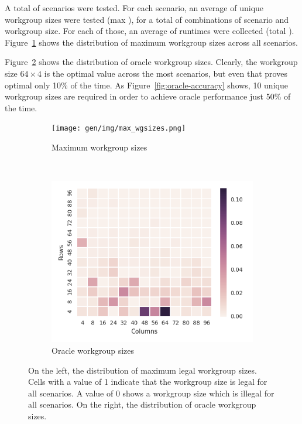 A total of  scenarios were tested. For each
scenario, an average of  unique workgroup
sizes were tested (max ), for a total of
 combinations of scenario and workgroup
size. For each of those, an average of 
runtimes were collected (total
). Figure~\ref{fig:max-wgsizes} shows the
distribution of maximum workgroup sizes across all
scenarios.

Figure~\ref{fig:oracle-wgsizes} shows the distribution of oracle
workgroup sizes. Clearly, the workgroup size $64 \times 4$ is the
optimal value across the most scenarios, but even that proves optimal
only 10\% of the time. As Figure~\ref{fig:oracle-accuracy} shows, 10
unique workgroup sizes are required in order to achieve oracle
performance just 50\% of the time.


\begin{figure}
\begin{subfigure}[t]{0.45\textwidth}
\centering
\texttt{[image: gen/img/max\_wgsizes.png]}
\vspace{-1.5em} %
\caption{Maximum workgroup sizes}
\label{fig:max-wgsizes}
\end{subfigure}
~
\begin{subfigure}[t]{0.45\textwidth}
\centering
\includegraphics{gen/img/oracle_param_space.png}
\vspace{-1.5em} %
\caption{Oracle workgroup sizes}
\label{fig:oracle-wgsizes}
\end{subfigure}
\caption{%
  On the left, the distribution of maximum legal workgroup
  sizes. Cells with a value of 1 indicate that the workgroup size is
  legal for all scenarios. A value of 0 shows a workgroup size which
  is illegal for all scenarios. On the right, the distribution of
  oracle workgroup sizes.%
}
\label{fig:heatmaps}
\end{figure}

